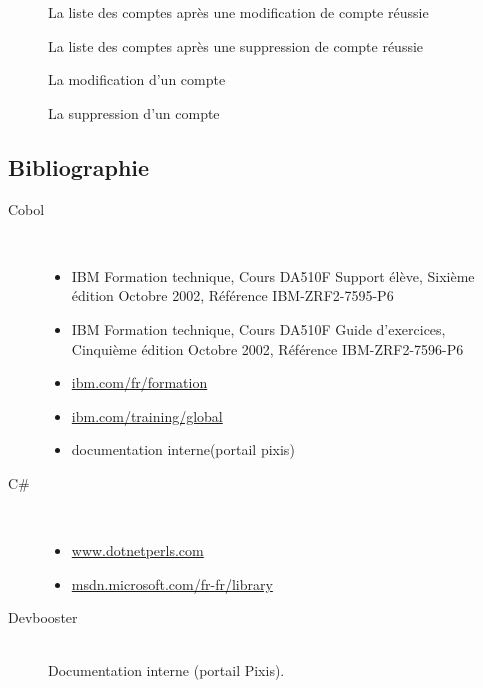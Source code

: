 \documentclass[a4paper,french,8pt]{article}
\begin{document}
		\begin{figure}[h!]
			\caption{La liste des comptes après une modification de compte réussie}
			\centering
		\end{figure} 
		\clearpage
		\begin{figure}[h!]
			\caption{La liste des comptes après une suppression de compte réussie}
			\centering
		\end{figure} 
		
		\begin{figure}[h!]
			\caption{La modification d'un compte}
			\centering
		\end{figure} 
		
		\begin{figure}[h!]
			\caption{La suppression d'un compte}
			\centering
		\end{figure} 
	
	
	
	\subsection{Bibliographie}
	
		\begin{description}		
				\item[Cobol] \hfill \\
					\begin{itemize}
						\item IBM Formation technique, Cours DA510F Support élève, Sixième édition Octobre 2002, Référence IBM-ZRF2-7595-P6
						\item IBM Formation technique, Cours DA510F Guide d'exercices, Cinquième édition Octobre 2002, Référence IBM-ZRF2-7596-P6
						\item \url{ibm.com/fr/formation}
						\item \url{ibm.com/training/global}
						\item documentation interne(portail pixis)
					\end{itemize}
					
				\item[C\#] \hfill \\
					\begin{itemize}
						\item \url{www.dotnetperls.com}
						\item \url{msdn.microsoft.com/fr-fr/library}
					\end{itemize}

				\item[Devbooster] \hfill \\
					Documentation interne (portail Pixis).
		\end{description}
\end{document}
